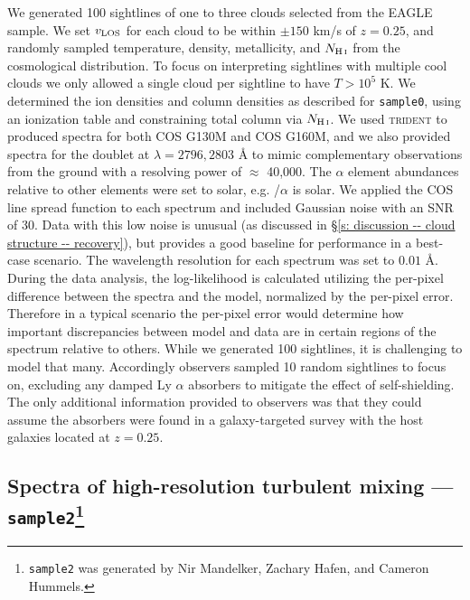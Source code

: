 \documentclass[fleqn,usenatbib]{mnras}
\begin{document}
We generated 100 sightlines of one to three clouds selected from the EAGLE sample.
We set $v_{\rm LOS}$ for each cloud to be within $\pm150$ km/s of $z=0.25$, and randomly sampled temperature, density, metallicity, and $N_{\ion{H}{I}}$ from the cosmological distribution.
To focus on interpreting sightlines with multiple cool clouds we only allowed a single cloud per sightline to have $T>10^5$ K.
We determined the ion densities and column densities as described for \texttt{sample0}, using an ionization table and constraining total column via $N_{\ion{H}{I}}$.
We used \textsc{trident} to produced spectra for both COS G130M and COS G160M, and we also provided spectra for the  doublet at $\lambda = 2796, 2803$ {\AA} to mimic complementary observations from the ground with a resolving power of $\approx$ 40,000.
The $\alpha$ element abundances relative to other elements were set to solar, e.g. /$\alpha$ is solar.
We applied the COS line spread function to each spectrum and included Gaussian noise with an SNR of 30.
Data with this low noise is unusual (as discussed in \S\ref{s: discussion -- cloud structure -- recovery}), but provides a good baseline for performance in a best-case scenario.
The wavelength resolution for each spectrum was set to $0.01$ \AA.
During the data analysis, the log-likelihood is calculated utilizing the per-pixel difference between the spectra and the model, normalized by the per-pixel error.
Therefore in a typical scenario the per-pixel error would determine how important discrepancies between model and data are in certain regions of the spectrum relative to others.
While we generated 100 sightlines, it is challenging to model that many.
Accordingly observers sampled 10 random sightlines to focus on, excluding any damped Ly $\alpha$ absorbers to mitigate the effect of self-shielding.
The only additional information provided to observers was that they could assume the absorbers were found in a galaxy-targeted survey with the host galaxies located at $z=0.25$.

\subsection[Spectra of high-resolution turbulent mixing --- \texttt{sample2}]{Spectra of high-resolution turbulent mixing --- \texttt{sample2}\footnote{
\texttt{sample2} was generated by Nir Mandelker, Zachary Hafen, and Cameron Hummels.}}
\label{s: data generation -- sample2}
\end{document}
